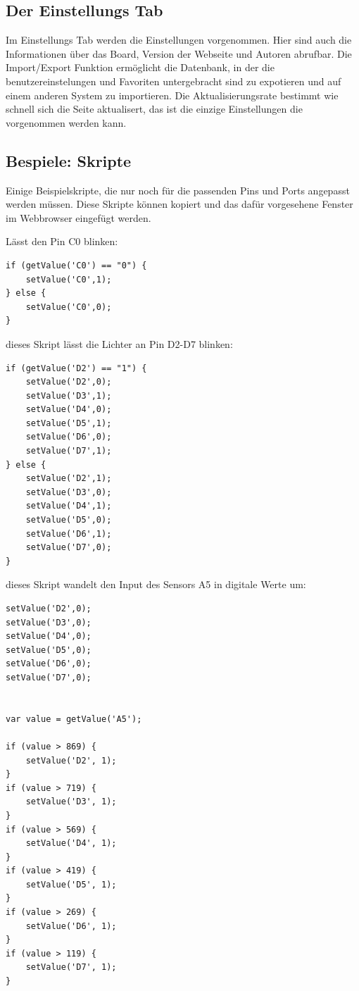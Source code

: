\subsection{Der Einstellungs Tab}
Im Einstellungs Tab werden die Einstellungen vorgenommen. Hier sind auch die
Informationen über das Board, Version der Webseite und Autoren abrufbar. Die
Import/Export Funktion ermöglicht die Datenbank, in der die benutzereinstelungen
und Favoriten untergebracht sind zu expotieren und auf einem anderen System zu
importieren. Die Aktualisierungsrate bestimmt wie schnell sich die Seite
aktualisert, das ist die einzige Einstellungen die vorgenommen werden kann.

\subsection{Bespiele: Skripte}
Einige Beispielskripte, die nur noch für die passenden Pins und Ports angepasst
werden müssen. Diese Skripte können kopiert und das dafür vorgesehene Fenster
im Webbrowser eingefügt werden.

Lässt den Pin C0 blinken:\newline
\begin{lstlisting}
if (getValue('C0') == "0") {
	setValue('C0',1);
} else {
	setValue('C0',0);
}
\end{lstlisting}

dieses Skript lässt die Lichter an Pin D2-D7 blinken:\newline
\begin{lstlisting}
if (getValue('D2') == "1") {
	setValue('D2',0);
	setValue('D3',1);
	setValue('D4',0);
	setValue('D5',1);
	setValue('D6',0);
	setValue('D7',1);
} else {
	setValue('D2',1);
	setValue('D3',0);
	setValue('D4',1);
	setValue('D5',0);
	setValue('D6',1);
	setValue('D7',0);
}
\end{lstlisting}

dieses Skript wandelt den Input des Sensors A5 in digitale Werte um:\newline
\begin{lstlisting}
setValue('D2',0);
setValue('D3',0);
setValue('D4',0);
setValue('D5',0);
setValue('D6',0);
setValue('D7',0);


var value = getValue('A5');

if (value > 869) {
	setValue('D2', 1);
}
if (value > 719) {
	setValue('D3', 1);
}
if (value > 569) {
	setValue('D4', 1);
}
if (value > 419) {
	setValue('D5', 1);
}
if (value > 269) {
	setValue('D6', 1);
}
if (value > 119) {
	setValue('D7', 1);
}
\end{lstlisting}

